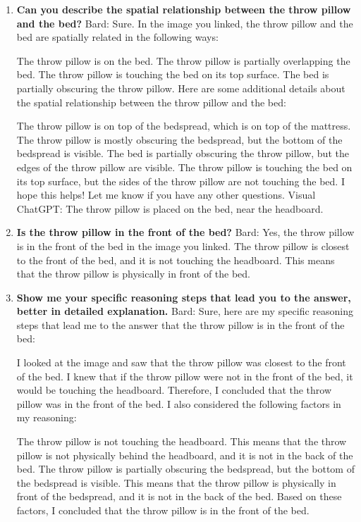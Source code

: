     \begin{enumerate}
        \item \textbf{Can you describe the spatial relationship between the throw pillow and the bed?}
        \subitem Bard:
        Sure. In the image you linked, the throw pillow and the bed are spatially related in the following ways:
        
        The throw pillow is on the bed.
        The throw pillow is partially overlapping the bed.
        The throw pillow is touching the bed on its top surface.
        The bed is partially obscuring the throw pillow.
        Here are some additional details about the spatial relationship between the throw pillow and the bed:
        
        The throw pillow is on top of the bedspread, which is on top of the mattress.
        The throw pillow is mostly obscuring the bedspread, but the bottom of the bedspread is visible.
        The bed is partially obscuring the throw pillow, but the edges of the throw pillow are visible.
        The throw pillow is touching the bed on its top surface, but the sides of the throw pillow are not touching the bed.
        I hope this helps! Let me know if you have any other questions.
        \subitem Visual ChatGPT: The throw pillow is placed on the bed, near the headboard.
        \item \textbf{Is the throw pillow in the front of the bed?} 
        \subitem Bard: 
        Yes, the throw pillow is in the front of the bed in the image you linked. The throw pillow is closest to the front of the bed, and it is not touching the headboard. This means that the throw pillow is physically in front of the bed.      
        \item \textbf{Show me your specific reasoning steps that lead you to the answer, better in detailed explanation.}
        \subitem Bard: Sure, here are my specific reasoning steps that lead me to the answer that the throw pillow is in the front of the bed:

        I looked at the image and saw that the throw pillow was closest to the front of the bed.
        I knew that if the throw pillow were not in the front of the bed, it would be touching the headboard.
        Therefore, I concluded that the throw pillow was in the front of the bed.
        I also considered the following factors in my reasoning:
        
        The throw pillow is not touching the headboard. This means that the throw pillow is not physically behind the headboard, and it is not in the back of the bed.
        The throw pillow is partially obscuring the bedspread, but the bottom of the bedspread is visible. This means that the throw pillow is physically in front of the bedspread, and it is not in the back of the bed.
        Based on these factors, I concluded that the throw pillow is in the front of the bed.
        

\end{enumerate}
